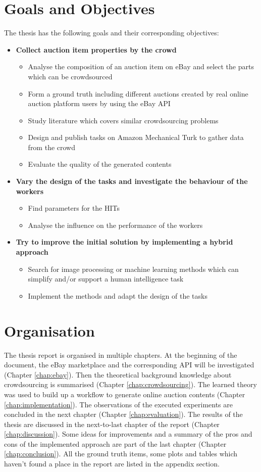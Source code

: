 \documentclass[a4paper]{report}
\begin{document}
\section{Goals and Objectives}
The thesis has the following goals and their corresponding objectives:
\begin{itemize}
	\item \textbf{Collect auction item properties by the crowd}
	\begin{itemize}
		\item Analyse the composition of an auction item on eBay and select the parts which can be crowdsourced
		\item Form a ground truth including different auctions created by real online auction platform users by using the eBay API
		\item Study literature which covers similar crowdsourcing problems
		\item Design and publish tasks on Amazon Mechanical Turk to gather data from the crowd
		\item Evaluate the quality of the generated contents
	\end{itemize}
	\item \textbf{Vary the design of the tasks and investigate the behaviour of the workers}
	\begin{itemize}
		\item Find parameters for the HITs
		\item Analyse the influence on the performance of the workers
	\end{itemize}
	\item \textbf{Try to improve the initial solution by implementing a hybrid approach}
	\begin{itemize}
		\item Search for image processing or machine learning methods which can simplify and/or support a human intelligence task
		\item Implement the methods and adapt the design of the tasks
	\end{itemize}
\end{itemize}

\section{Organisation}
The thesis report is organised in multiple chapters. At the beginning of the document, the eBay marketplace and the corresponding API will be investigated (Chapter \ref{chap:ebay}). Then the theoretical background knowledge about crowdsourcing is summarised (Chapter \ref{chap:crowdsourcing}). The learned theory was used to build up a workflow to generate online auction contents (Chapter \ref{chap:implementation}). The observations of the executed experiments are concluded in the next chapter (Chapter \ref{chap:evaluation}). The results of the thesis are discussed in the next-to-last chapter of the report (Chapter \ref{chap:discussion}). Some ideas for improvements and a summary of the pros and cons of the implemented approach are part of the last chapter (Chapter \ref{chap:conclusion}). All the ground truth items, some plots and tables which haven't found a place in the report are listed in the appendix section.
\end{document}
